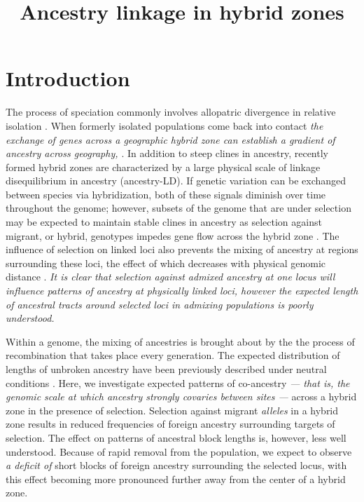 \documentclass[12pt]{article}
\title{Ancestry linkage in hybrid zones}
\author{}
\date{} %
\newcommand{\yb}[1]{{\em \color{magenta} #1}}
\begin{document}
\maketitle

\section{Introduction}
The process of speciation commonly involves allopatric divergence in relative isolation \citep{Coyne2004}. When formerly isolated populations come back into contact \yb{the exchange of genes across a geographic hybrid zone can establish a gradient of ancestry across geography, \citep{Barton1985}}. In addition to steep clines in ancestry, recently formed hybrid zones are characterized by a large physical scale of linkage disequilibrium in ancestry (ancestry-LD). If genetic variation can be exchanged between species via hybridization, both of these signals diminish over time throughout the genome; however, subsets of the genome that are under selection may be expected to maintain stable clines in ancestry as selection against migrant, or hybrid, genotypes impedes gene flow across the hybrid zone \citep{Barton1979a}. The influence of selection on linked loci also prevents the mixing of ancestry at regions surrounding these loci, the effect of which decreases with physical genomic distance \citep{Barton1986}. \yb{It is clear that selection against admixed ancestry at one locus will influence patterns of ancestry at physically linked loci, however the expected length of ancestral tracts around selected loci in admixing populations is poorly understood.}


Within a genome, the mixing of ancestries is brought about by the the process of recombination that takes place every generation. The expected distribution of lengths of unbroken ancestry have been previously described under neutral conditions \cite[e.g.][]{Gravel2012,Sedghifar2015}.  
Here, we investigate expected patterns of co-ancestry \yb{ --- that is, the genomic scale at which ancestry strongly covaries between sites --- } across a hybrid zone in the presence of selection. 
Selection against migrant \yb{alleles} in a hybrid zone results in reduced frequencies of foreign ancestry surrounding targets of selection. 
The effect on patterns of ancestral block lengths is, however, less well understood. 
Because of rapid removal from the population, we expect to observe \yb{a deficit of} short blocks of foreign ancestry surrounding the selected locus, with this effect becoming more pronounced further away from the center of a hybrid zone.
\end{document}
